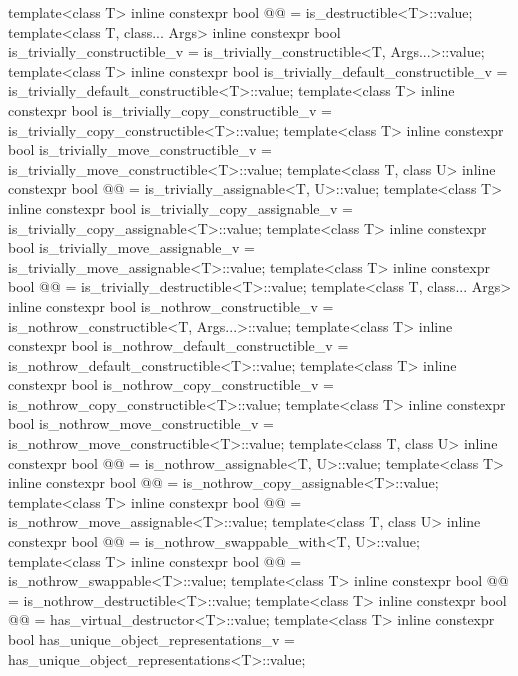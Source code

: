 \begin{codeblock}
{  template<class T>
    inline constexpr bool @@ = is_destructible<T>::value;
  template<class T, class... Args>
    inline constexpr bool is_trivially_constructible_v
      = is_trivially_constructible<T, Args...>::value;
  template<class T>
    inline constexpr bool is_trivially_default_constructible_v
      = is_trivially_default_constructible<T>::value;
  template<class T>
    inline constexpr bool is_trivially_copy_constructible_v
      = is_trivially_copy_constructible<T>::value;
  template<class T>
    inline constexpr bool is_trivially_move_constructible_v
      = is_trivially_move_constructible<T>::value;
  template<class T, class U>
    inline constexpr bool @@ = is_trivially_assignable<T, U>::value;
  template<class T>
    inline constexpr bool is_trivially_copy_assignable_v
      = is_trivially_copy_assignable<T>::value;
  template<class T>
    inline constexpr bool is_trivially_move_assignable_v
      = is_trivially_move_assignable<T>::value;
  template<class T>
    inline constexpr bool @@ = is_trivially_destructible<T>::value;
  template<class T, class... Args>
    inline constexpr bool is_nothrow_constructible_v
      = is_nothrow_constructible<T, Args...>::value;
  template<class T>
    inline constexpr bool is_nothrow_default_constructible_v
      = is_nothrow_default_constructible<T>::value;
  template<class T>
    inline constexpr bool is_nothrow_copy_constructible_v
      = is_nothrow_copy_constructible<T>::value;
  template<class T>
    inline constexpr bool is_nothrow_move_constructible_v
      = is_nothrow_move_constructible<T>::value;
  template<class T, class U>
    inline constexpr bool @@ = is_nothrow_assignable<T, U>::value;
  template<class T>
    inline constexpr bool @@ = is_nothrow_copy_assignable<T>::value;
  template<class T>
    inline constexpr bool @@ = is_nothrow_move_assignable<T>::value;
  template<class T, class U>
    inline constexpr bool @@ = is_nothrow_swappable_with<T, U>::value;
  template<class T>
    inline constexpr bool @@ = is_nothrow_swappable<T>::value;
  template<class T>
    inline constexpr bool @@ = is_nothrow_destructible<T>::value;
  template<class T>
    inline constexpr bool @@ = has_virtual_destructor<T>::value;
  template<class T>
    inline constexpr bool has_unique_object_representations_v
      = has_unique_object_representations<T>::value;

}
\end{codeblock}
